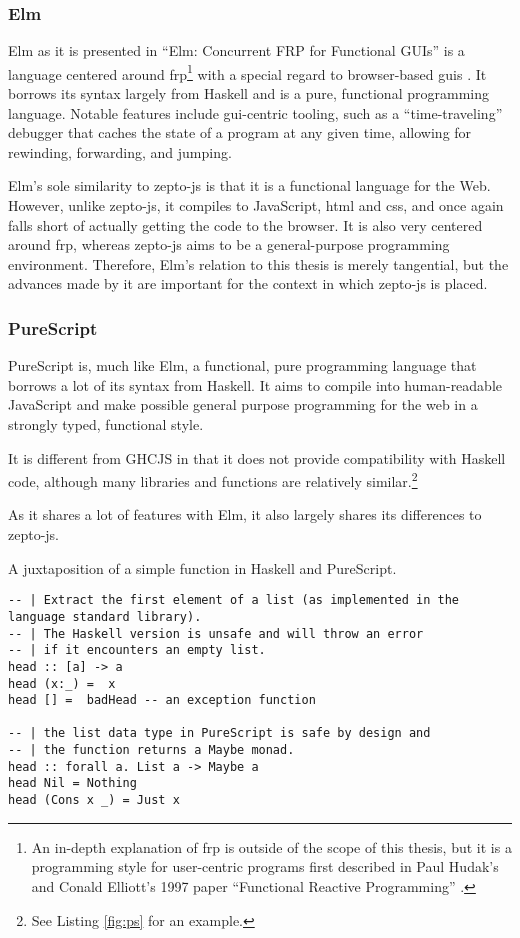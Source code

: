 \documentclass[oneside,11pt,xetex]{scrbook}
\begin{document}
\subsubsection{Elm}

Elm as it is presented in ``Elm: Concurrent FRP for Functional GUIs''
is a language centered around \gls{frp}\footnote{An in-depth
explanation of \gls{frp} is outside of the scope of this thesis,
but it is a programming style for user-centric programs first described
in Paul Hudak's and Conald Elliott's 1997 paper ``Functional Reactive
Programming'' \parencite{FRP}.} with a special regard to browser-based
\glspl{gui} \parencite{CPL}. It borrows its syntax largely from Haskell
and is a pure, functional programming language. Notable features include
\gls{gui}-centric tooling, such as a ``time-traveling'' debugger that caches
the state of a program at any given time, allowing for rewinding, forwarding,
and jumping.

Elm's sole similarity to zepto-js is that it is a functional language for the Web.
However, unlike zepto-js, it compiles to JavaScript, \gls{html} and \gls{css}, and
once again falls short of actually getting the code to the browser. It is also very
centered around \gls{frp}, whereas zepto-js aims to be a general-purpose programming
environment. Therefore, Elm's relation to this thesis is merely tangential, but the
advances made by it are important for the context in which zepto-js is placed.

\subsubsection{PureScript}

PureScript is, much like Elm, a functional, pure programming language
that borrows a lot of its syntax from Haskell. It aims to compile into
human-readable JavaScript and make possible general purpose programming
for the web in a strongly typed, functional style.

It is different from GHCJS in that it does not provide compatibility
with Haskell code, although many libraries and functions are relatively
similar.\footnote{See Listing \ref{fig:ps} for an example.}

As it shares a lot of features with Elm, it also largely shares its
differences to zepto-js.

\begin{listing}[H]
\caption{A juxtaposition of a simple function in Haskell and PureScript.}
\begin{verbatim}
-- | Extract the first element of a list (as implemented in the language standard library).
-- | The Haskell version is unsafe and will throw an error
-- | if it encounters an empty list.
head :: [a] -> a
head (x:_) =  x
head [] =  badHead -- an exception function

-- | the list data type in PureScript is safe by design and
-- | the function returns a Maybe monad.
head :: forall a. List a -> Maybe a
head Nil = Nothing
head (Cons x _) = Just x
\end{verbatim}
\label{fig:ps}
\end{listing}
\end{document}
